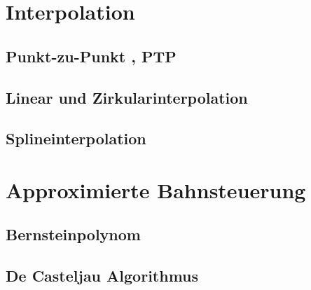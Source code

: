 \section{Interpolation}
\subsection{Punkt-zu-Punkt , PTP}
\subsection{Linear und Zirkularinterpolation}
\subsection{Splineinterpolation}
\section{Approximierte Bahnsteuerung}
\subsection{Bernsteinpolynom}
\subsection{De Casteljau Algorithmus}
